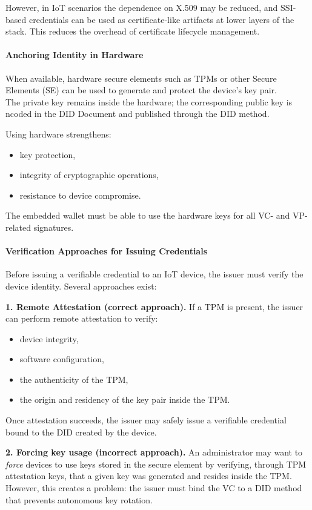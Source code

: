 \noindent
However, in IoT scenarios the dependence on X.509 may be reduced, and SSI-based credentials can be used as certificate-like artifacts at lower layers of the stack. This reduces the overhead of certificate lifecycle management.

\paragraph{Anchoring Identity in Hardware}
When available, hardware secure elements such as TPMs or other Secure Elements (SE) can be used to generate and protect the device's key pair.\\ 
The private key remains inside the hardware; the corresponding public key is ncoded in the DID Document and published through the DID method.
\smallskip


\noindent
Using hardware strengthens:
\begin{itemize}
    \item key protection,
    \item integrity of cryptographic operations,
    \item resistance to device compromise.
\end{itemize}

\noindent
The embedded wallet must be able to use the hardware keys for all VC- and
VP-related signatures.

\paragraph{Verification Approaches for Issuing Credentials}
Before issuing a verifiable credential to an IoT device, the issuer must verify the device identity. Several approaches exist:
\bigskip

\noindent
\textbf{1. Remote Attestation (correct approach).}  
If a TPM is present, the issuer can perform remote attestation to verify:
\begin{itemize}
    \item device integrity,
    \item software configuration,
    \item the authenticity of the TPM,
    \item the origin and residency of the key pair inside the TPM.
\end{itemize}
Once attestation succeeds, the issuer may safely issue a verifiable credential bound to the DID created by the device.
\bigskip

\noindent
\textbf{2. Forcing key usage (incorrect approach).}  
An administrator may want to \emph{force} devices to use keys stored in the secure element by verifying, through TPM attestation keys, that a given key was generated and resides inside the TPM.\\
However, this creates a problem: the issuer must bind the VC to a DID method that prevents autonomous key rotation.
\smallskip

